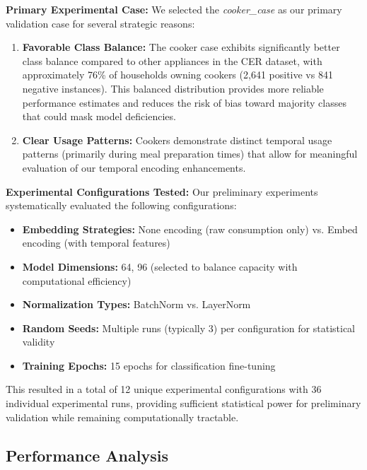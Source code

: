 \documentclass[conference]{IEEEtran}
\begin{document}
\textbf{Primary Experimental Case:} We selected the \textit{cooker\_case} as our primary validation case for several strategic reasons:

\begin{enumerate}
    \item \textbf{Favorable Class Balance:} The cooker case exhibits significantly better class balance compared to other appliances in the CER dataset, with approximately 76\% of households owning cookers (2,641 positive vs 841 negative instances). This balanced distribution provides more reliable performance estimates and reduces the risk of bias toward majority classes that could mask model deficiencies.
    
    \item \textbf{Clear Usage Patterns:} Cookers demonstrate distinct temporal usage patterns (primarily during meal preparation times) that allow for meaningful evaluation of our temporal encoding enhancements.

\end{enumerate}

\textbf{Experimental Configurations Tested:} Our preliminary experiments systematically evaluated the following configurations:

\begin{itemize}
    \item \textbf{Embedding Strategies:} None encoding (raw consumption only) vs. Embed encoding (with temporal features)
    \item \textbf{Model Dimensions:} 64, 96 (selected to balance capacity with computational efficiency)
    \item \textbf{Normalization Types:} BatchNorm vs. LayerNorm
    \item \textbf{Random Seeds:} Multiple runs (typically 3) per configuration for statistical validity
    \item \textbf{Training Epochs:} 15 epochs for classification fine-tuning
\end{itemize}

This resulted in a total of 12 unique experimental configurations with 36 individual experimental runs, providing sufficient statistical power for preliminary validation while remaining computationally tractable.

\subsection{Performance Analysis}
\end{document}
